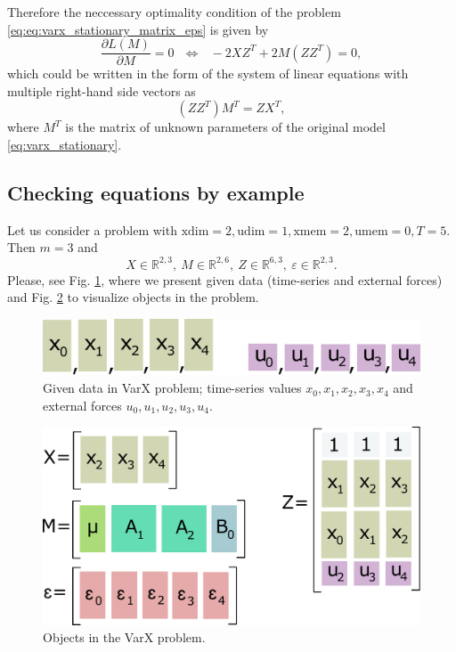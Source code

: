  Therefore the neccessary optimality condition of the problem \eqref{eq:eq:varx_stationary_matrix_eps} is given by
 \begin{displaymath}
  \frac{\partial L(M)}{\partial M} = 0 ~~~ \Leftrightarrow ~~~ -2XZ^T + 2M(ZZ^T) = 0,
 \end{displaymath}
 which could be written in the form of the system of linear equations with multiple right-hand side vectors as
 \begin{equation}
  \label{eq:varx_stationary_system}
  (ZZ^T) M^T = ZX^T,
 \end{equation}
 where $M^T$ is the matrix of unknown parameters of the original model \eqref{eq:varx_stationary}.

 \subsection{Checking equations by example}
 
 Let us consider a problem with $\mathrm{xdim} = 2, \mathrm{udim} = 1, \mathrm{xmem} = 2, \mathrm{umem} = 0, T = 5$. Then $m = 3$ and
 \begin{displaymath}
  X \in \mathbb{R}^{2,3}, ~ M \in \mathbb{R}^{2,6}, ~ Z \in \mathbb{R}^{6,3}, ~\varepsilon \in \mathbb{R}^{2,3}.
 \end{displaymath}
 Please, see Fig. \ref{fig:varx1}, where we present given data (time-series and external forces) and Fig. \ref{fig:varx2} to visualize objects in the problem.
 
 \begin{figure}[h!]
  \centering
    \includegraphics[scale=0.2]{figure/varx1.pdf}
  \caption{Given data in VarX problem; time-series values $x_0,x_1,x_2,x_3,x_4$ and external forces $u_0,u_1,u_2,u_3,u_4$.}
  \label{fig:varx1}
 \end{figure}

 \begin{figure}[h!]
  \centering
    \includegraphics[scale=0.2]{figure/varx2.pdf}
  \caption{Objects in the VarX problem.}
  \label{fig:varx2}
 \end{figure}

